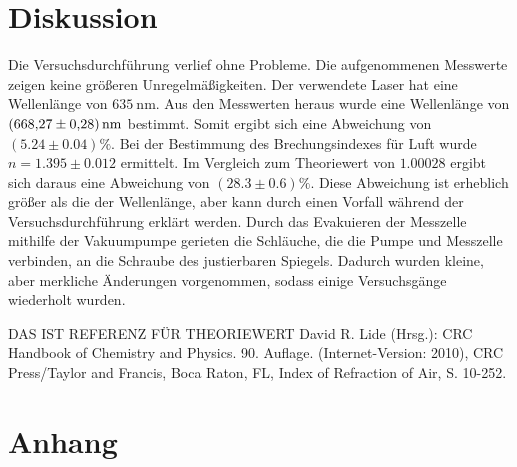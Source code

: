 \section{Diskussion}
\label{sec:Diskussion}

Die Versuchsdurchführung verlief ohne Probleme.
Die aufgenommenen Messwerte zeigen keine größeren Unregelmäßigkeiten.
Der verwendete Laser hat eine Wellenlänge von $\SI{635}{\nano\metre}$.
Aus den Messwerten heraus wurde eine Wellenlänge von $\SI{668.27 \pm 0.28}{\nano\metre}$ bestimmt.
Somit ergibt sich eine Abweichung von $(5.24 \pm 0.04) \%$.
\noindent
Bei der Bestimmung des Brechungsindexes für Luft wurde $n = 1.395 \pm 0.012$ ermittelt.
Im Vergleich zum Theoriewert von $1.00028$ ergibt sich daraus eine Abweichung von $(28.3 \pm 0.6)\%$.
Diese Abweichung ist erheblich größer als die der Wellenlänge, aber kann durch einen Vorfall während der Versuchsdurchführung erklärt werden.
Durch das Evakuieren der Messzelle mithilfe der Vakuumpumpe gerieten die Schläuche, die die Pumpe und Messzelle verbinden, an die Schraube des justierbaren Spiegels.
Dadurch wurden kleine, aber merkliche Änderungen vorgenommen, sodass einige Versuchsgänge wiederholt wurden.


DAS IST REFERENZ FÜR THEORIEWERT
David R. Lide (Hrsg.): CRC Handbook of Chemistry and Physics. 90. Auflage. (Internet-Version: 2010), CRC Press/Taylor and Francis, Boca Raton, FL, Index of Refraction of Air, S. 10-252.

\section{Anhang}
\label{sec:Anhang}

